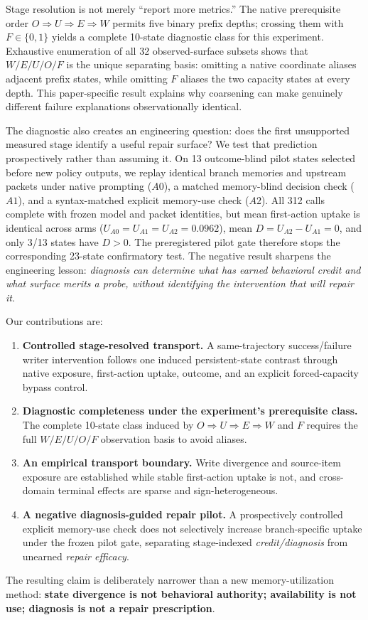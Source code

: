 Stage resolution is not merely ``report more metrics.'' The native prerequisite order $O\Rightarrow U\Rightarrow E\Rightarrow W$ permits five binary prefix depths; crossing them with $F\in\{0,1\}$ yields a complete 10-state diagnostic class for this experiment. Exhaustive enumeration of all 32 observed-surface subsets shows that $W/E/U/O/F$ is the unique separating basis: omitting a native coordinate aliases adjacent prefix states, while omitting $F$ aliases the two capacity states at every depth. This paper-specific result explains why coarsening can make genuinely different failure explanations observationally identical.

The diagnostic also creates an engineering question: does the first unsupported measured stage identify a useful repair surface? We test that prediction prospectively rather than assuming it. On 13 outcome-blind pilot states selected before new policy outputs, we replay identical branch memories and upstream packets under native prompting ($A0$), a matched memory-blind decision check ($A1$), and a syntax-matched explicit memory-use check ($A2$). All 312 calls complete with frozen model and packet identities, but mean first-action uptake is identical across arms ($U_{A0}=U_{A1}=U_{A2}=0.0962$), mean $D=U_{A2}-U_{A1}=0$, and only 3/13 states have $D>0$. The preregistered pilot gate therefore stops the corresponding 23-state confirmatory test. The negative result sharpens the engineering lesson: \emph{diagnosis can determine what has earned behavioral credit and what surface merits a probe, without identifying the intervention that will repair it}.

Our contributions are:
\begin{enumerate}
    \item \textbf{Controlled stage-resolved transport.} A same-trajectory success/failure writer intervention follows one induced persistent-state contrast through native exposure, first-action uptake, outcome, and an explicit forced-capacity bypass control.
    \item \textbf{Diagnostic completeness under the experiment's prerequisite class.} The complete 10-state class induced by $O\Rightarrow U\Rightarrow E\Rightarrow W$ and $F$ requires the full $W/E/U/O/F$ observation basis to avoid aliases.
    \item \textbf{An empirical transport boundary.} Write divergence and source-item exposure are established while stable first-action uptake is not, and cross-domain terminal effects are sparse and sign-heterogeneous.
    \item \textbf{A negative diagnosis-guided repair pilot.} A prospectively controlled explicit memory-use check does not selectively increase branch-specific uptake under the frozen pilot gate, separating stage-indexed \emph{credit/diagnosis} from unearned \emph{repair efficacy}.
\end{enumerate}

The resulting claim is deliberately narrower than a new memory-utilization method: \textbf{state divergence is not behavioral authority; availability is not use; diagnosis is not a repair prescription}.

